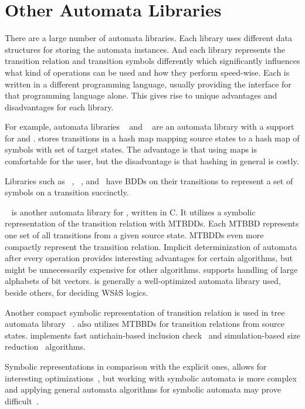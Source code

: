 \section{Other Automata Libraries}
\label{sec:other_automata_libraries}

There are a large number of automata libraries.
Each library uses different data structures for storing the automata instances.
And each library represents the transition relation and transition symbols differently which significantly influences what kind of operations can be used and how they perform speed-wise.
Each is written in a different programming language, usually providing the interface for that programming language alone.
This gives rise to unique advantages and disadvantages for each library.

For example, automata libraries \fado~\cite{fado} and \automatapy~\cite{automatapy} are an automata library with a support for \nfas and \dfas.
\automatapy stores transitions in a hash map mapping source states to a hash map of symbols with set of target states.
The advantage is that using maps is comfortable for the user, but the disadvantage is that hashing in general is costly.

Libraries such as \spot~\cite{spot}, \mosel~\cite{mosel}, and~\cite{owl} have BDDs on their transitions to represent a set of symbols on a transition succinctly.

\mona~\cite{mona} is another automata library for \dfas, written in C.
It utilizes a symbolic representation of the transition relation with MTBDDs.
Each MTBBD represents one set of all transitions from a given source state.
MTBDDs even more compactly represent the transition relation.
Implicit determinization of automata after every operation provides interesting advantages for certain algorithms, but might be unnecessarily expensive for other algorithms.
\mona supports handling of large alphabets of bit vectors.
\mona is generally a well-optimized automata library used, beside others, for deciding WS$k$S logics.

Another compact symbolic representation of transition relation is used in tree automata library \vata~\cite{vata}.
\vata also utilizes MTBBDs for transition relations from source states.
\vata implements fast antichain-based inclusion check~\cite{doyen-antichain-10} and simulation-based size reduction~\cite{ranzato_efficient_2010, treesimulation08} algorithms.

Symbolic representations in comparison with the explicit ones, allows for interesting optimizations~\cite{dantoni_taminimization_2016}, but working with symbolic automata is more complex and applying general automata algorithms for symbolic automata may prove difficult~\cite{dantoni_taminimization_2016, symbsim18}.

